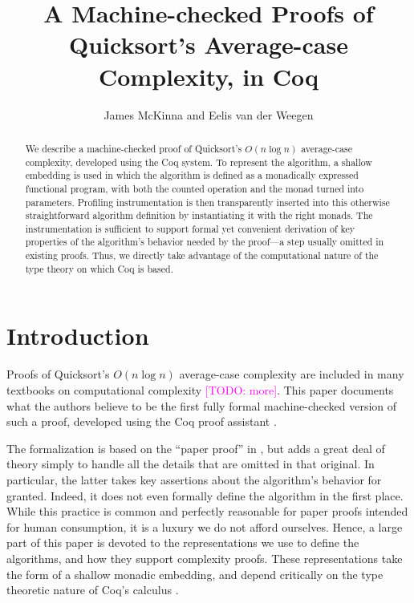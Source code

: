\documentclass[runningheads]{llncs}
\newcommand{\todo}[1]{\textcolor{magenta}{[TODO: #1]}}
\begin{document}
\nocite{*}

\title{A Machine-checked Proofs of Quicksort's Average-case Complexity, in Coq}

\authorrunning{\em}
\titlerunning{\em}

\author{James McKinna and Eelis van der Weegen}


\maketitle

\begin{abstract}
  We describe a machine-checked proof of Quicksort's $O(n \log n)$ average-case complexity, developed using the Coq system. To represent the algorithm, a shallow embedding is used in which the algorithm is defined as a monadically expressed functional program, with both the counted operation and the monad turned into parameters. Profiling instrumentation is then transparently inserted into this otherwise straightforward algorithm definition by instantiating it with the right monads. The instrumentation is sufficient to support formal yet convenient derivation of key properties of the algorithm's behavior needed by the proof---a step usually omitted in existing proofs. Thus, we directly take advantage of the computational nature of the type theory on which Coq is based.
\end{abstract}

\section{Introduction}

Proofs of Quicksort's $O(n \log n)$ average-case complexity are included in many textbooks on computational complexity \cite{introtoalgos} \todo{more}. This paper documents what the authors believe to be the first fully formal machine-checked version of such a proof, developed using the Coq proof assistant \cite{coq}.

The formalization is based on the ``paper proof'' in \cite{introtoalgos}, but adds a great deal of theory simply to handle all the details that are omitted in that original. In particular, the latter takes key assertions about the algorithm's behavior for granted. Indeed, it does not even formally define the algorithm in the first place. While this practice is common and perfectly reasonable for paper proofs intended for human consumption, it is a luxury we do not afford ourselves. Hence, a large part of this paper is devoted to the representations we use to define the algorithms, and how they support complexity proofs. These representations take the form of a shallow monadic embedding, and depend critically on the type theoretic nature of Coq's calculus \cite{coq'art}.
\end{document}
